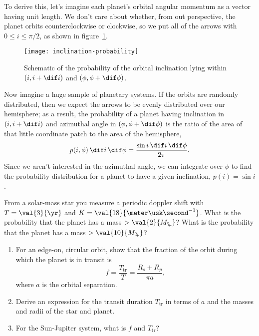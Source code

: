 To derive this, let's imagine each planet's orbital angular momentum as a vector having unit length.  We don't care about whether, from out perspective, the planet orbits counterclockwise or clockwise, so we put all of the arrows with $0\le i\le \pi/2$, as shown in figure~\ref{f.inclination-probability}.  

\begin{figure}[ht]
\texttt{[image: inclination-probability]}
\caption[Schematic of the probability distribution of orbital inclination]{Schematic of the probability of the orbital inclination lying within $(i,i+\dif i)$ and $(\phi,\phi+\dif\phi)$.}
\label{f.inclination-probability}
\end{figure}

Now imagine a huge sample of planetary systems.  If the orbits are randomly distributed, then we expect the arrows to be evenly distributed over our hemisphere; as a result, the probability of a planet having inclination in $(i,i+\dif i)$ and azimuthal angle in $(\phi,\phi+\dif\phi)$ is the ratio of the area of that little coordinate patch to the area of the hemisphere,
\[ p(i,\phi)\,\dif i\,\dif \phi = \frac{\sin i\,\dif i\,\dif\phi}{2\pi}. \]
Since we aren't interested in the azimuthal angle, we can integrate over $\phi$ to find the probability distribution for a planet to have a given inclination, $p(i) = \sin i$.


\begin{exercisebox}
From a solar-mass star you measure a periodic doppler shift with $T = \val{3}{\yr}$ and $K = \val{18}{\meter\usk\second^{-1}}$.  What is the probability that the planet has a mass $>\val{2}{M_{\jupiter}}$? What is the probability that the planet has a mass $>\val{10}{M_{\jupiter}}$?
\end{exercisebox}

\begin{exercisebox}
\begin{enumerate}\renewcommand{\labelenumi}{\alph{enumi})}
\item\label{e.transit-fraction}
For an edge-on, circular orbit, show that the fraction of the orbit during which the planet is in transit is
\[ f = \frac{T_{\mathrm{tr}}}{T} = \frac{R_{s}+R_{p}}{\pi a}, \]
where $a$ is the orbital separation.

\item\label{e.transit-duration}
Derive an expression for the transit duration $T_{\mathrm{tr}}$ in terms of $a$ and the masses and radii of the star and planet.

\item\label{e.transit-properties-jupiter}
For the Sun-Jupiter system, what is $f$ and $T_{\mathrm{tr}}$?

\end{enumerate}
\end{exercisebox}

